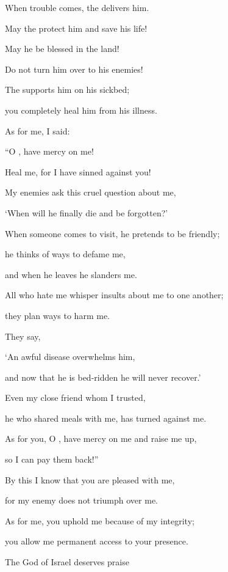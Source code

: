 {\par }{\Q When
trouble
comes,
the {}
delivers him.
\par }{\Q {}May the
{}
protect
him and save his life!

\par }{\Q May he be blessed
in the land!
\par }{\Q Do not
turn
him over
to his enemies!
\par }{\Q {}The
{}
supports
him on
his sickbed;
\par }{\Q you completely
heal
him from his illness.
\par }{\Q {}As for me, I
said:

\par }{\Q “O
{}, have mercy
on me!
\par }{\Q Heal
me,
for
I have sinned against you!
\par }{\Q {}My enemies
ask
this cruel
question about me,

\par }{\Q ‘When
will he finally die
and be forgotten?’
\par }{\Q {}When
someone comes
to visit,
he pretends
to be friendly;
\par }{\Q he thinks
of ways to defame
me,

\par }{\Q and when he leaves
he slanders me.
\par }{\Q {}All
who hate
me whisper
insults about me to one another;

\par }{\Q they plan
ways to harm me.
\par }{\Q {}They say,
\par }{\Q ‘An awful
disease overwhelms
him,

\par }{\Q and now that he is bed-ridden
he will never recover.’
\par }{\Q {}Even
my close
friend
whom
I trusted,
\par }{\Q he who shared
meals
with me, has turned against me.
\par }{\Q {}As for you,
O
{}, have mercy
on me and raise
me up,
\par }{\Q so I can pay
them back!”
\par }{\Q {}By this
I know
that
you are pleased
with me,
\par }{\Q for
my enemy
does not
triumph
over me.
\par }{\Q {}As for me,
you uphold
me because of my integrity;
\par }{\Q you allow me permanent
access
to your presence.
\par }{\Q {}The
{}
God
of Israel
deserves
praise

}
